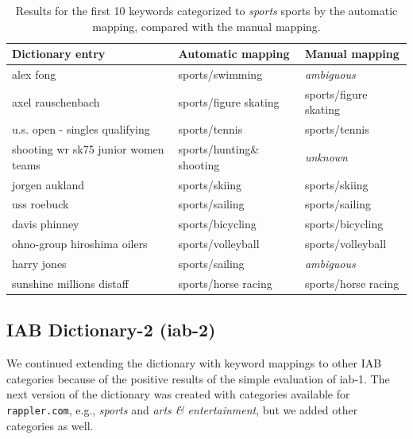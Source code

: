 \begin{table}[h]
\centering
\renewcommand{\arraystretch}{1.25}
\begin{tabularx}{\textwidth}{ l|X|X }
{\bf Dictionary entry}              & {\bf Automatic mapping}  & {\bf Manual mapping}  \\ \hline
alex fong                           & sports/swimming          & {\it ambiguous}       \\ \hline
axel rauschenbach                   & sports/figure skating    & sports/figure skating \\ \hline
u.s. open - singles qualifying      & sports/tennis            & sports/tennis         \\ \hline
shooting wr sk75 junior women teams & sports/hunting\& shooting & {\it unknown}         \\ \hline
jorgen aukland                      & sports/skiing            & sports/skiing         \\ \hline
uss roebuck                         & sports/sailing           & sports/sailing        \\ \hline
davis phinney                       & sports/bicycling         & sports/bicycling      \\ \hline
ohno-group hiroshima oilers         & sports/volleyball        & sports/volleyball     \\ \hline
harry jones                         & sports/sailing           & {\it ambiguous}       \\ \hline
sunshine millions distaff           & sports/horse racing      & sports/horse racing                
\end{tabularx}
\caption[Comparison of manual and automatic mapping, sports]{Results for the first 10 keywords categorized to \emph{sports} sports by the automatic mapping, compared with the manual mapping.}
\label{tab:manual_mapping_sports_iab-1}
\end{table}

\subsection{IAB Dictionary-2 (iab-2)}
We continued extending the dictionary with keyword mappings to other IAB categories because of the positive results of the simple evaluation of iab-1.  The next version of the dictionary was created with categories available for \texttt{rappler.com}, e.g., \emph{sports} and \emph{arts \& entertainment}, but we added other categories as well. 

